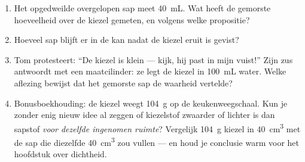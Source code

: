 \begin{problem}
\begin{enumerate}[resume]
  \item Het opgedweilde overgelopen sap meet \qty{40}{mL}. Wat heeft
        de gemorste hoeveelheid over de kiezel gemeten, en volgens
        welke propositie?
  \item Hoeveel sap blijft er in de kan nadat de kiezel eruit is
        gevist?
  \item Tom protesteert: ``De kiezel is klein --- kijk, hij past in
        mijn vuist!'' Zijn zus antwoordt met een maatcilinder: ze
        legt de kiezel in \qty{100}{mL} water. Welke aflezing bewijst
        dat het gemorste sap de waarheid vertelde?
  \item Bonusboekhouding: de kiezel weegt \qty{104}{g} op de
        keukenweegschaal. Kun je zonder enig nieuw idee al zeggen of
        kiezelstof zwaarder of lichter is dan sapstof \emph{voor
        dezelfde ingenomen ruimte}? Vergelijk \qty{104}{g} kiezel in
        \qty{40}{cm^3} met de  sap die diezelfde
        \qty{40}{cm^3} zou vullen --- en houd je conclusie warm voor
        het hoofdstuk over dichtheid.
\end{enumerate}
\end{problem}
